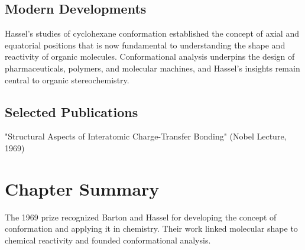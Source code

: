 \subsection*{Modern Developments}

Hassel's studies of cyclohexane conformation established the concept of axial and equatorial positions that is now fundamental to understanding the shape and reactivity of organic molecules. Conformational analysis underpins the design of pharmaceuticals, polymers, and molecular machines, and Hassel's insights remain central to organic stereochemistry.

\subsection*{Selected Publications}

"Structural Aspects of Interatomic Charge-Transfer Bonding" (Nobel Lecture, 1969)

\clearpage

\section*{Chapter Summary}

The 1969 prize recognized Barton and Hassel for developing the concept of conformation and applying it in chemistry. Their work linked molecular shape to chemical reactivity and founded conformational analysis.

